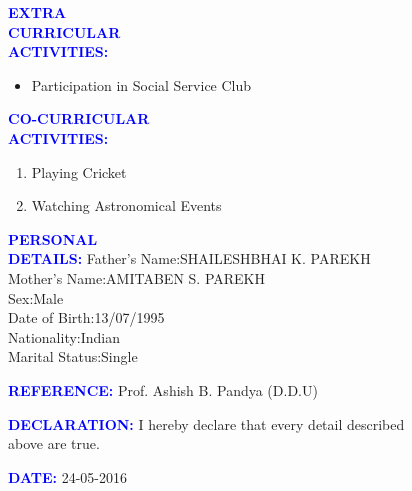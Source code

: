 \documentclass{article}
\begin{document}
\begin{flushleft}
	\textcolor{blue}{\textbf{EXTRA\\ CURRICULAR\\ ACTIVITIES:}}
	\begin{itemize}
		\vspace{-0.29in}
		\addtolength{\itemindent}{1.0in}
		\item Participation in Social Service Club 
	\end{itemize}
\end{flushleft}
\begin{flushleft}
	\textcolor{blue}{\textbf{CO-CURRICULAR\\ ACTIVITIES:}}
	\begin{enumerate}
		\vspace{-0.29in}
		\addtolength{\itemindent}{1.0in}
		\item Playing Cricket
		\item Watching Astronomical Events
	\end{enumerate}
\end{flushleft}
\begin{flushleft}
	\textcolor{blue}{\textbf{PERSONAL\\ DETAILS:}}
	\hspace{1.02in}
	Father's Name:\hspace{0.1in}SHAILESHBHAI K. PAREKH\\	
	\hspace{1.8in}
	Mother's Name:\hspace{0.06in}AMITABEN S. PAREKH\\
	\hspace{1.8in}
	Sex:\hspace{0.78in}Male\\
	\hspace{1.8in}
	Date of Birth:\hspace{0.16in}13/07/1995\\
	\hspace{1.8in}
	Nationality:\hspace{0.3in}Indian\\
	\hspace{1.8in}
	Marital Status:\hspace{0.1in}Single\\
\end{flushleft}
\begin{flushleft}
	\textcolor{blue}{\textbf{REFERENCE:}}
	\hspace{0.7in}
	Prof. Ashish B. Pandya (D.D.U)
\end{flushleft}
\begin{flushleft}
	\textcolor{blue}{\textbf{DECLARATION:}}
	\hspace{0.5in}
	I hereby declare that every detail described\\ \hspace{1.77in} above are true.
\end{flushleft}
\begin{flushleft}
	
	\textcolor{blue}{\textbf{DATE:}}
	\hspace{1.23in}
	24-05-2016
\end{flushleft}
\end{document}
